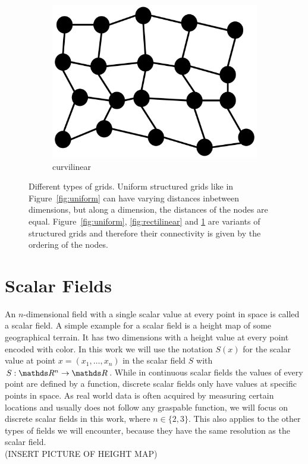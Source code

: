 \begin{figure}
\begin{subfigure}[b]{0.19\textwidth}
    \includegraphics[clip=true, width=\textwidth]{Images/curvilinear.pdf}
    \caption{curvilinear}
    \label{fig:curvilinear}
  \end{subfigure}
  
  \caption{Different types of grids. Uniform structured grids like in
  Figure~\ref{fig:uniform} can have varying distances inbetween
  dimensions, but along a dimension, the distances of the nodes are
  equal. Figure~\ref{fig:uniform}, \ref{fig:rectilinear} and
  \ref{fig:curvilinear} are variants of structured grids and therefore
  their connectivity is given by the ordering of the nodes.}
  \label{fig:grids}
\end{figure}

\section{Scalar Fields}

An $n$-dimensional field with a single scalar value at every point in
space is called a scalar field. A simple example for a scalar field is a
height map of some geographical terrain. It has two dimensions with a
height value at every point encoded with color. In this work we will use
the notation $S(x)$ for the scalar value at point $x = (x_1,\dots,x_n)$
in the scalar field $S$ with $S: \real^n \rightarrow \real$. While in
continuous scalar fields the values of every point are defined by a
function, discrete scalar fields only have values at specific points in
space. As real world data is often acquired by measuring certain
locations and usually does not follow any graspable function, we will
focus on discrete scalar fields in this work, where $n \in \{2,3\}$.
This also applies to the other types of fields we will encounter,
because they have the same resolution as the scalar field.
\\(INSERT PICTURE OF HEIGHT MAP)

